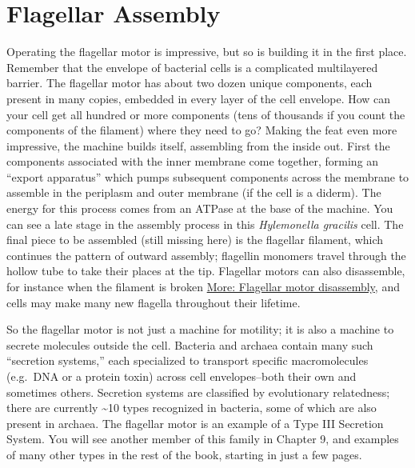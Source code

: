 \documentclass[]{tufte-book}
\begin{document}
\section{Flagellar Assembly}\label{flagellar-assembly}

Operating the flagellar motor is impressive, but so is building it in
the first place. Remember that the envelope of bacterial cells is a
complicated multilayered barrier. The flagellar motor has about two
dozen unique components, each present in many copies, embedded in every
layer of the cell envelope. How can your cell get all hundred or more
components (tens of thousands if you count the components of the
filament) where they need to go? Making the feat even more impressive,
the machine builds itself, assembling from the inside out. First the
components associated with the inner membrane come together, forming an
``export apparatus'' which pumps subsequent components across the
membrane to assemble in the periplasm and outer membrane (if the cell is
a diderm). The energy for this process comes from an ATPase at the base
of the machine. You can see a late stage in the assembly process in this
\emph{Hylemonella gracilis} cell. The final piece to be assembled (still
missing here) is the flagellar filament, which continues the pattern of
outward assembly; flagellin monomers travel through the hollow tube to
take their places at the tip. Flagellar motors can also disassemble, for
instance when the filament is broken
\protect\hyperlink{Flagellar_motor_disassembly}{More: Flagellar motor
disassembly}, and cells may make many new flagella throughout their
lifetime.

So the flagellar motor is not just a machine for motility; it is also a
machine to secrete molecules outside the cell. Bacteria and archaea
contain many such ``secretion systems,'' each specialized to transport
specific macromolecules (e.g.~DNA or a protein toxin) across cell
envelopes--both their own and sometimes others. Secretion systems are
classified by evolutionary relatedness; there are currently
\textasciitilde{}10 types recognized in bacteria, some of which are also
present in archaea. The flagellar motor is an example of a Type III
Secretion System. You will see another member of this family in Chapter
9, and examples of many other types in the rest of the book, starting in
just a few pages.
\end{document}
